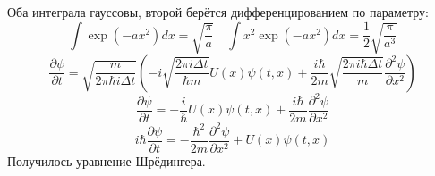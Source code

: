 \documentclass[12pt]{article}
\begin{document}
Оба интеграла гауссовы, второй берётся дифференцированием по параметру:
\begin{equation}
    \int\exp(-ax^2)dx=\sqrt{\frac{\pi}{a}}\quad \int x^2\exp(-ax^2)dx=\frac{1}{2}\sqrt{\frac{\pi}{a^3}}
\end{equation}
\begin{equation}
    \frac{\partial\psi}{\partial t}=\sqrt{\frac{m}{2\pi\hbar i\Delta t}}\left(-i\sqrt{\frac{2\pi i\Delta t}{\hbar m}}U(x)\psi(t,x)+\frac{i\hbar}{2m}\sqrt{\frac{2\pi i\hbar\Delta t}{m}}\frac{\partial^2\psi}{\partial x^2}\right)
\end{equation}
\begin{equation}
    \frac{\partial\psi}{\partial t}=-\frac{i}{\hbar}U(x)\psi(t,x)+\frac{i\hbar}{2m}\frac{\partial^2\psi}{\partial x^2}
\end{equation}
\begin{equation}
    i\hbar\frac{\partial\psi}{\partial t}=-\frac{\hbar^2}{2m}\frac{\partial^2\psi}{\partial x^2}+U(x)\psi(t,x)
\end{equation}
Получилось уравнение Шрёдингера.
\end{document}
